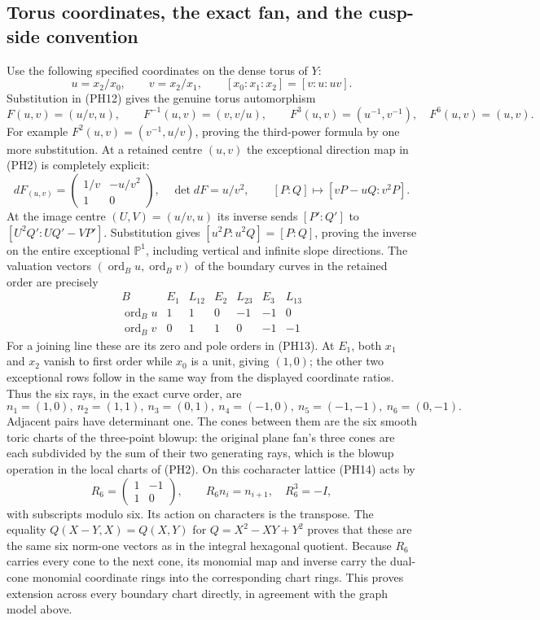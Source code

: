 \subsection{Torus coordinates, the exact fan, and the cusp-side convention}
Use the following specified coordinates on the dense torus of $Y$:
\[
 u=x_2/x_0,\qquad v=x_2/x_1,
 \qquad [x_0:x_1:x_2]=[v:u:uv].                                \tag{PH13}
\]
Substitution in (PH12) gives the genuine torus automorphism
\[
 F(u,v)=(u/v,u),\qquad F^{-1}(u,v)=(v,v/u),\qquad
 F^3(u,v)=(u^{-1},v^{-1}),\quad F^6(u,v)=(u,v).                  \tag{PH14}
\]
For example $F^2(u,v)=(v^{-1},u/v)$, proving the third-power formula by
one more substitution. At a retained centre $(u,v)$ the exceptional
direction map in (PH2) is completely explicit:
\[
dF_{(u,v)}=\begin{pmatrix}1/v&-u/v^2\\1&0\end{pmatrix},\quad
\det dF=u/v^2,\qquad
[P:Q]\longmapsto[vP-uQ:v^2P].                                  \tag{PH14a}
\]
At the image centre $(U,V)=(u/v,u)$ its inverse sends
$[P':Q']$ to $[U^2Q':UQ'-VP']$. Substitution gives
$[u^2P:u^2Q]=[P:Q]$, proving the inverse on the entire exceptional
$\mathbb P^1$, including vertical and infinite slope directions.
The valuation vectors
$(\operatorname{ord}_B u,\operatorname{ord}_B v)$ of the boundary curves
in the retained order are precisely
\[
\begin{array}{c|rrrrrr}
B&E_1&L_{12}&E_2&L_{23}&E_3&L_{13}\\\hline
\operatorname{ord}_B u&1&1&0&-1&-1&0\\
\operatorname{ord}_B v&0&1&1&0&-1&-1
\end{array}                                                     \tag{PH15}
\]
For a joining line these are its zero and pole orders in (PH13). At $E_1$,
both $x_1$ and $x_2$ vanish to first order while $x_0$ is a unit, giving
$(1,0)$; the other two exceptional rows follow in the same way from the
displayed coordinate ratios. Thus the six rays, in the exact curve order,
are
\[
n_1=(1,0),\ n_2=(1,1),\ n_3=(0,1),\ n_4=(-1,0),\
n_5=(-1,-1),\ n_6=(0,-1).
\]
Adjacent pairs have determinant one. The cones between them are the six
smooth toric charts of the three-point blowup: the original plane fan's
three cones are each subdivided by the sum of their two generating rays,
which is the blowup operation in the local charts of (PH2).
On this cocharacter lattice (PH14) acts by
\[
 R_6=\begin{pmatrix}1&-1\\1&0\end{pmatrix},\qquad
 R_6n_i=n_{i+1},\quad R_6^3=-I,
\]
with subscripts modulo six. Its action on characters is the transpose.
The equality $Q(X-Y,X)=Q(X,Y)$ for $Q=X^2-XY+Y^2$ proves that these are
the same six norm-one vectors as in the integral hexagonal quotient.
Because $R_6$ carries every cone to the next cone, its monomial map and
inverse carry the dual-cone monomial coordinate rings into the corresponding
chart rings. This proves extension across every boundary chart directly,
in agreement with the graph model above.

